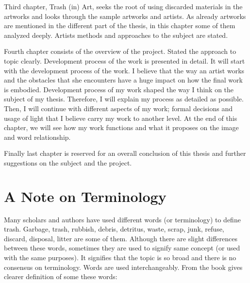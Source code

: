 Third chapter, Trash (in) Art, seeks the root of using discarded materials in the artworks and looks through the sample artworks and artists. As already artworks are mentioned in the different part of the thesis, in this chapter some of them analyzed deeply. Artists methods and approaches to the subject are stated.

Fourth chapter consists of the overview of the project. Stated the approach to topic clearly. Development process of the work is presented in detail. It will start with the development process of the work. I believe that the way an artist works and the obstacles that she encounters have a huge impact on how the final work is embodied. Development process of my work shaped the way I think on the subject of my thesis. Therefore, I will explain my process as detailed as possible. Then, I will continue with different aspects of my work; formal decisions and usage of light that I believe carry my work to another level. At the end of this chapter, we will see how my work functions and what it proposes on the image and word relationship. 

Finally last chapter is reserved for an overall conclusion of this thesis and further suggestions on the subject and the project.





%
\section{A Note on Terminology}
Many scholars and authors have used different words (or terminology) to define trash. Garbage, trash, rubbish, debris, detritus, waste, scrap, junk, refuse, discard, disposal, litter are some of them. Although there are slight differences between these words, sometimes they are used to signify same concept (or used with the same purposes). It signifies that the topic is so broad and there is no consensus on terminology. Words are used interchangeably. From the book  gives clearer definition of some these words:

